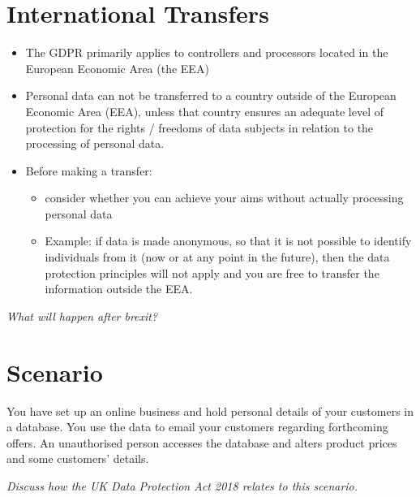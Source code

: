 \documentclass{article}
\begin{document}
\section{International Transfers}
\begin{itemize}
\item The GDPR primarily applies to controllers and processors located in the European Economic Area (the EEA)

\item Personal data can not be transferred to a country outside of the European Economic Area (EEA), unless that country ensures an adequate level of protection for the rights / freedoms of data subjects in relation to the processing of personal data. 

\item Before making a transfer:
\begin{itemize}
\item consider whether you can achieve your aims without actually processing personal data
\item Example: if data is made anonymous, so that it is not possible to identify individuals from it (now or at any point in the future), then the data protection principles will not apply and you are free to transfer the information outside the EEA.
\end{itemize}
\end{itemize}

\bigskip
{\em What will happen after brexit?}





\section{Scenario}
You have set up an online business and hold personal details of your customers in a database. You use the data to email your customers regarding forthcoming offers. An unauthorised person accesses the database and alters product prices and some customers' details.

\bigskip
{\em Discuss how the UK Data Protection Act 2018 relates to this scenario.}
\end{document}
